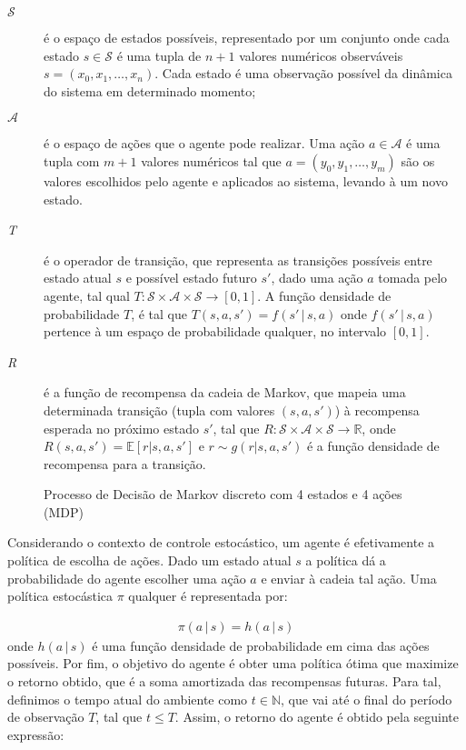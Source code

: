 \begin{description}
	\item[$\mathcal{S}$] 
	é o espaço de estados possíveis, representado por um conjunto onde cada estado $s \in \mathcal{S}$ é uma tupla de $n + 1$ valores numéricos observáveis $s = (x_{0}, x_{1}, \ldots, x_{n})$. Cada estado é uma observação possível da dinâmica do sistema em determinado momento;
	
	\item[$\mathcal{A}$] é o espaço de ações que o agente pode realizar. Uma ação $a \in \mathcal{A}$ é uma tupla com $m + 1$ valores numéricos tal que $a = (y_{0}, y_{1}, \ldots, y_{m})$ são os valores escolhidos pelo agente e aplicados ao sistema, levando à um novo estado.
	
	\item[\textit{T}] é o operador de transição, que representa as transições possíveis entre estado atual $s$ e possível estado futuro $s'$, dado uma ação $a$ tomada pelo agente, tal qual \(T : \mathcal{S} \times \mathcal{A} \times \mathcal{S} \rightarrow [0, 1]\). A função densidade de probabilidade $T$, é tal que $T(s, a, s') = f(s' \,|\, s, a)$ onde $f(s' \,|\, s, a)$ pertence à um espaço de probabilidade qualquer, no intervalo $[0, 1]$.
	
	\item[\textit{R}] é a função de recompensa da cadeia de Markov, que mapeia uma determinada transição (tupla com valores $(s, a, s')$) à recompensa esperada no próximo estado $s'$, tal que
	$R : \mathcal{S} \times \mathcal{A} \times \mathcal{S} \rightarrow \mathbb{R}$, onde $R(s, a, s') = \mathbb{E}[r | s, a, s']$ e $r \sim g(r | s, a, s')$ é a função densidade de recompensa para a transição.
\end{description}

\begin{figure}[H]
	\centering
	
	\caption{Processo de Decisão de Markov discreto com 4 estados e 4 ações (MDP)}
	\label{fig:mdp}
\end{figure}

Considerando o contexto de controle estocástico, um agente é efetivamente a política de escolha de ações. Dado um estado atual $s$ a política dá a probabilidade do agente escolher uma ação $a$ e enviar à cadeia tal ação. Uma política estocástica $\pi$ qualquer é representada por:

\begin{equation}
	\begin{aligned}
	\pi(a \,|\, s) = h(a \,|\, s)
	\end{aligned}
\end{equation}
onde $h(a \,|\, s)$ é uma função densidade de probabilidade em cima das ações possíveis.
Por fim, o objetivo do agente é obter uma política ótima que maximize o retorno obtido, que é a soma amortizada das recompensas futuras. Para tal, definimos o tempo atual do ambiente como $t \in \mathbb{N}$, que vai até o final do período de observação $T$, tal que $t \leq T$. Assim, o retorno do agente é obtido pela seguinte expressão:

